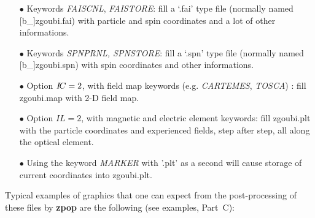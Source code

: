 \begin{itemize}
  \item[$\bullet$] Keywords \textsl{FAISCNL}, \textsl{FAISTORE}:
   fill a `.fai' type file (normally 
  named [b\_]zgoubi.fai) with particle and spin 
coordinates and a lot of other informations. 

  \item[$\bullet$] Keywords \textsl{SPNPRNL, SPNSTORE}:
   fill  a `.spn' type file (normally 
  named [b\_]zgoubi.spn)  with spin 
coordinates and other informations. 

 \item[$\bullet$] Option $I\!C=2$, with field map keywords (e.g. 
 \textsl{CARTEMES}, 
\textsl{TOSCA}) : fill  zgoubi.map  with 2-D field map. 

  \item[$\bullet$] Option $IL=2$, with magnetic and electric element 
keywords: fill zgoubi.plt with the particle coordinates and 
experienced fields, step after step, all along the optical 
element.

  \item[$\bullet$] Using the keyword \textsl{MARKER}  
with '.plt' as a second \LABEL {} will cause storage of current coordinates into zgoubi.plt. 


\end{itemize}

\noindent Typical examples of graphics that one can expect from the 
post-processing of these files by \textbf{zpop}
are the following (see examples, Part~C):

